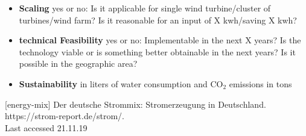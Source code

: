 \documentclass[12pt,a4paper]{article}
\begin{document}
\begin{parcolumns}[colwidths={1=2.5 cm, 2=10 cm, 3=2.5cm}]{3}
{\begin{itemize}
\item \textbf{Scaling} yes or no: Is it applicable for single wind turbine/cluster of turbines/wind farm? Is it reasonable for an input of X kwh/saving X kwh?
\item \textbf{technical Feasibility} yes or no: Implementable in the next X years? Is the technology viable or is something better obtainable in the next years? Is it possible in the geographic area? 
\item \textbf{Sustainability} in liters of water consumption and CO$_{2}$ emissions in tons\\
\end{itemize}
[energy-mix]  Der deutsche Strommix: Stromerzeugung in Deutschland. \\https://strom-report.de/strom/.\\Last accessed 21.11.19


}


\end{parcolumns}
\end{document}
